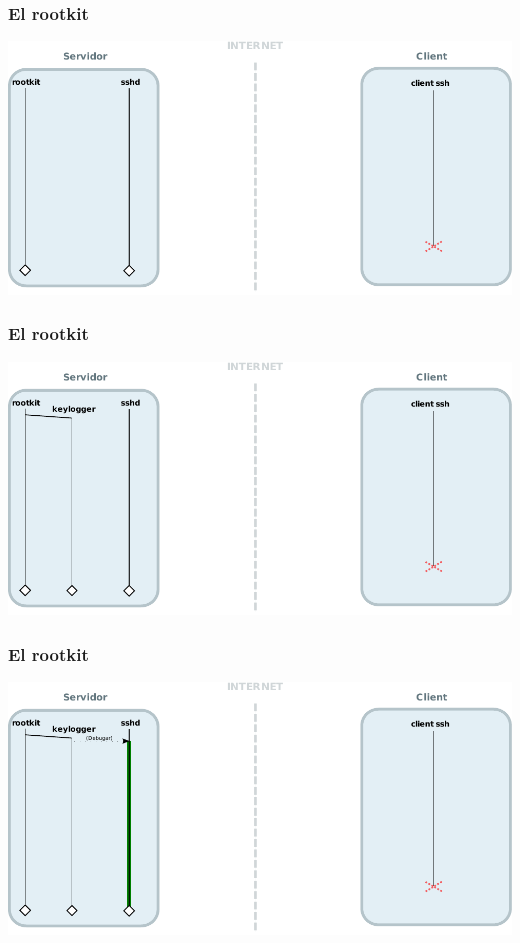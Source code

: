 \documentclass{beamer}
\begin{document}
\begin{frame}
	\frametitle{El rootkit}
	\includegraphics[scale=0.65,keepaspectratio]{sshd_keylogger_1.pdf}
\end{frame}

\begin{frame}
	\frametitle{El rootkit}
	\includegraphics[scale=0.65,keepaspectratio]{sshd_keylogger_2.pdf}
\end{frame}

\begin{frame}
	\frametitle{El rootkit}
	\includegraphics[scale=0.65,keepaspectratio]{sshd_keylogger_3.pdf}
\end{frame}
\end{document}
